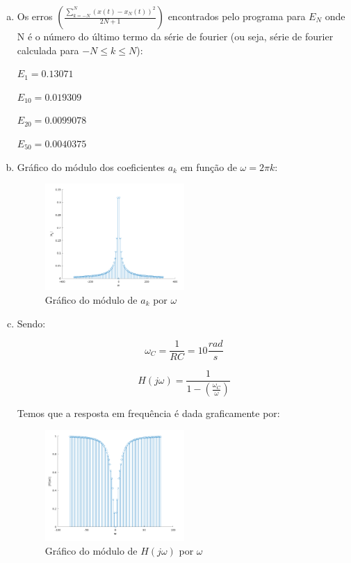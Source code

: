\documentclass{article}
\begin{document}
\begin{enumerate}[(a)]
\item 
    Os erros $\left ( \frac{\sum\limits _{k = -N} ^{N} (x(t) - x_N(t))^2}{2N+1} \right )$ encontrados pelo programa para $E_N$ onde N é o número do último termo da série de fourier (ou seja, série de fourier calculada para $-N \leq k \leq N$):
\hfill\break

$E_1 = 0.13071$

$E_{10} = 0.019309$

$E_{20} = 0.0099078$

$E_{50} = 0.0040375$

\break\hfill

\item

Gráfico do módulo dos coeficientes $a_k$ em função de $\omega = 2 \pi k$:

\begin{figure}[H]
\centering
\includegraphics[width=0.5\textwidth]{images/ak_x_w.png}
    \caption{Gráfico do módulo de $a_k$ por $\omega$}
\end{figure}

\item

Sendo:

\begin{equation}
    \omega_C = \frac{1}{RC} = 10 \frac{rad}{s}
\end{equation}

\begin{equation}
    H(j \omega) = \frac{1}{1 - \left ( \frac{\omega_C}{\omega} \right )}
\end{equation}

Temos que a resposta em frequência é dada graficamente por:

\begin{figure}[H]
\centering
\includegraphics[width=0.5\textwidth]{images/abs_x_w.png}
    \caption{Gráfico do módulo de $H(j\omega)$ por $\omega$}
\end{figure}


\end{enumerate}
\end{document}

